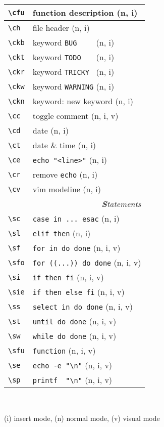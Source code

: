 \documentclass[oneside,12pt,a4paper,DIV18]{scrartcl}
\begin{document}
\begin{center}
\begin{tabular}[]{|p{11mm}|p{59mm}|}
\hline \verb'\cfu' & function description             \hfill (n, i) \\
\hline \verb'\ch'  & file header                      \hfill (n, i) \\
\hline \verb'\ckb' & keyword \verb'BUG    '           \hfill (n, i) \\
\hline \verb'\ckt' & keyword \verb'TODO   '           \hfill (n, i) \\
\hline \verb'\ckr' & keyword \verb'TRICKY '           \hfill (n, i) \\
\hline \verb'\ckw' & keyword \verb'WARNING'           \hfill (n, i) \\
\hline \verb'\ckn' & keyword: new keyword             \hfill (n, i) \\
\hline \verb'\cc'  & toggle comment                   \hfill (n, i, v) \\
\hline \verb'\cd'  & date                             \hfill (n, i) \\
\hline \verb'\ct'  & date \& time                     \hfill (n, i) \\
\hline \verb'\ce'  & \verb'echo "<line>"'             \hfill (n, i) \\
\hline \verb'\cr'  & remove \verb'echo'               \hfill (n, i) \\
\hline \verb'\cv'  & vim modeline                     \hfill (n, i) \\
\hline
\hline 
\hline
\multicolumn{2}{|r|}{\textsl{\textbf{S}tatements}} \\
\hline \verb'\sc'  & \verb'case in ... esac'    \hfill (n, i) \\
\hline \verb'\sl'  & \verb'elif then'           \hfill (n, i) \\
\hline \verb'\sf'  & \verb'for in do done'      \hfill (n, i, v) \\
\hline \verb'\sfo' & \verb'for ((...)) do done'      \hfill (n, i, v) \\
\hline \verb'\si'  & \verb'if then fi'          \hfill (n, i, v) \\
\hline \verb'\sie' & \verb'if then else fi'     \hfill (n, i, v) \\
\hline \verb'\ss'  & \verb'select in do done'   \hfill (n, i, v) \\
\hline \verb'\st'  & \verb'until do done'       \hfill (n, i, v) \\
\hline \verb'\sw'  & \verb'while do done'       \hfill (n, i, v) \\
\hline \verb'\sfu' & \verb'function'            \hfill (n, i, v) \\
\hline \verb'\se'  & \verb'echo -e "\n"'        \hfill (n, i, v) \\
\hline \verb'\sp'  & \verb'printf  "\n"'        \hfill (n, i, v) \\
\hline
\end{tabular} \\
\begin{flushleft}
{\small
{\normalsize (i)} insert mode, {\normalsize (n)} normal mode, {\normalsize (v)} visual mode
}%
\end{flushleft}


\end{center}
\end{document}
